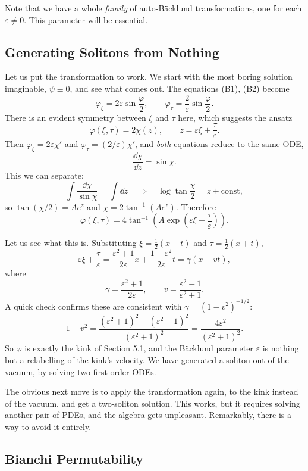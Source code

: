 \documentclass[a4paper]{scrartcl}
\begin{document}
Note that we have a whole \emph{family} of auto-B\"acklund transformations, one for each $\varepsilon\neq 0$. This parameter will be essential.

\subsection{Generating Solitons from Nothing}

Let us put the transformation to work. We start with the most boring solution imaginable, $\psi \equiv 0$, and see what comes out. The equations (B1), (B2) become
$$
\varphi_\xi = 2\varepsilon\sin\frac{\varphi}{2}, \qquad \varphi_\tau = \frac{2}{\varepsilon}\sin\frac{\varphi}{2}.
$$
There is an evident symmetry between $\xi$ and $\tau$ here, which suggests the ansatz
$$
\varphi(\xi,\tau) = 2\chi(z), \qquad z = \varepsilon\xi + \frac{\tau}{\varepsilon}.
$$
Then $\varphi_\xi = 2\varepsilon\chi'$ and $\varphi_\tau = (2/\varepsilon)\chi'$, and \emph{both} equations reduce to the same ODE,
$$
\frac{\dd\chi}{\dd z} = \sin\chi.
$$
This we can separate:
$$
\int\frac{\dd\chi}{\sin\chi} = \int\dd z \quad\Longrightarrow\quad \log\tan\frac{\chi}{2} = z + \text{const},
$$
so $\tan(\chi/2) = Ae^z$ and $\chi = 2\tan^{-1}(Ae^z)$. Therefore
$$
\varphi(\xi,\tau) = 4\tan^{-1}\left(A\exp\left(\varepsilon\xi + \frac{\tau}{\varepsilon}\right)\right).
$$

Let us see what this is. Substituting $\xi = \frac{1}{2}(x-t)$ and $\tau = \frac{1}{2}(x+t)$,
$$
\varepsilon\xi + \frac{\tau}{\varepsilon} = \frac{\varepsilon^2+1}{2\varepsilon}x + \frac{1-\varepsilon^2}{2\varepsilon}t = \gamma\left(x - vt\right),
$$
where
$$
\gamma = \frac{\varepsilon^2+1}{2\varepsilon}, \qquad v = \frac{\varepsilon^2-1}{\varepsilon^2+1}.
$$
A quick check confirms these are consistent with $\gamma = (1-v^2)^{-1/2}$:
$$
1 - v^2 = \frac{(\varepsilon^2+1)^2 - (\varepsilon^2-1)^2}{(\varepsilon^2+1)^2} = \frac{4\varepsilon^2}{(\varepsilon^2+1)^2}.
$$
So $\varphi$ is exactly the kink of Section 5.1, and the B\"acklund parameter $\varepsilon$ is nothing but a relabelling of the kink's velocity. We have generated a soliton out of the vacuum, by solving two first-order ODEs.

The obvious next move is to apply the transformation again, to the kink instead of the vacuum, and get a two-soliton solution. This works, but it requires solving another pair of PDEs, and the algebra gets unpleasant. Remarkably, there is a way to avoid it entirely.

\subsection{Bianchi Permutability}
\end{document}
